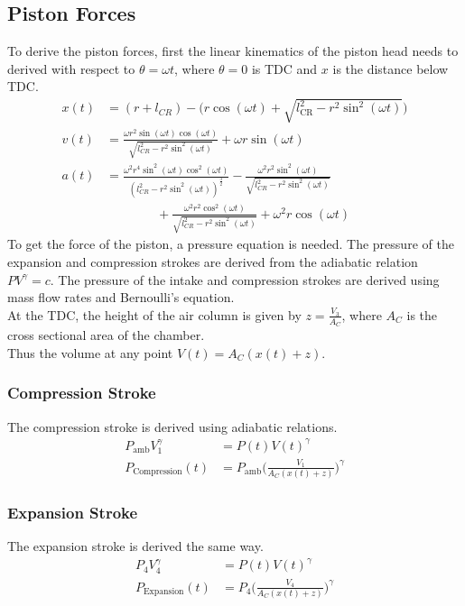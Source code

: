 \documentclass[10pt,a4paper]{article}
\begin{document}
\subsection*{Piston Forces}
To derive the piston forces, first the linear kinematics of the piston head needs to derived with respect to $\theta = \omega t$, where $\theta = 0$ is TDC and $x$ is the distance below TDC.
\begin{align}
	x(t ) &= (r + l_{CR}) - \Big(r \cos (\omega t)  + \sqrt{l_{\text{CR}}^2 - r^2 \sin^2 (\omega t )} \Big)\\
	v(t ) &=  \frac{\omega r^{2} \sin{\left (\omega t \right )} \cos{\left (\omega t \right )}}{\sqrt{l_{CR}^{2} - r^{2} \sin^{2}{\left (\omega t \right )}}} + \omega r \sin{\left (\omega t \right )}\\
	a (t) &=  \frac{\omega^{2} r^{4} \sin^{2}{\left (\omega t \right )} \cos^{2}{\left (\omega t \right )}}{\left(l_{CR}^{2} - r^{2} \sin^{2}{\left (\omega t \right )}\right)^{\frac{3}{2}}} - \frac{\omega^{2} r^{2} \sin^{2}{\left (\omega t \right )}}{\sqrt{l_{CR}^{2} - r^{2} \sin^{2}{\left (\omega t \right )}}}\nonumber \\
	&  \qquad \qquad + \frac{\omega^{2} r^{2} \cos^{2}{\left (\omega t \right )}}{\sqrt{l_{CR}^{2} - r^{2} \sin^{2}{\left (\omega t \right )}}} + \omega^{2} r \cos{\left (\omega t \right )}
\end{align}
To get the force of the piston, a pressure equation is needed. The pressure of the expansion and compression strokes are derived from the adiabatic relation $P V^{\gamma} = c$.
The pressure of the intake and compression strokes are derived using mass flow rates and Bernoulli's equation.\\
At the TDC, the height of the air column is given by $z = \frac{V_3}{A_C}$, where $A_C$ is the cross sectional area of the chamber.\\ Thus the volume at any point $V(t) = A_C (x(t)+z)$. \\
\subsubsection*{Compression Stroke}
The compression stroke is derived using adiabatic relations.
\begin{align}
	P_{\text{amb}} V_1^{\gamma} &= P(t) V(t)^{\gamma}\\
	P_{\text{Compression}}(t) &= P_{\text{amb}} \Big( \frac{V_1}{A_C (x(t)+z)} \Big)^{\gamma}
\end{align}
\subsubsection*{Expansion Stroke} 
The expansion stroke is derived the same way.
\begin{align}
	P_{4} V_4^{\gamma} &= P(t) V(t)^{\gamma}\\
	P_{\text{Expansion}}(t) &= P_{4} \Big( \frac{V_4}{A_C (x(t)+z)} \Big)^{\gamma}
\end{align}
\end{document}
